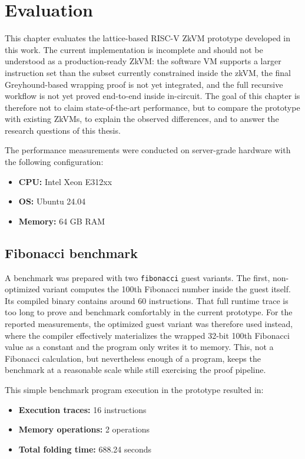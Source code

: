 \chapter{Evaluation}\label{chap:evaluation}

This chapter evaluates the lattice-based RISC-V ZkVM prototype developed in
this work. The current implementation is incomplete and should not be understood
as a production-ready ZkVM: the software VM supports a larger instruction set
than the subset currently constrained inside the zkVM, the final Greyhound-based
wrapping proof is not yet integrated, and the full recursive workflow is not
yet proved end-to-end inside in-circuit. The goal of this
chapter is therefore not to claim state-of-the-art performance, but to compare
the prototype with existing ZkVMs, to explain the observed differences, and to
answer the research questions of this thesis.

The performance measurements were conducted on server-grade hardware with the
following configuration:

\begin{itemize}
	\item \textbf{CPU:} Intel Xeon E312xx
	\item \textbf{OS:} Ubuntu 24.04
	\item \textbf{Memory:} 64 GB RAM
\end{itemize}

\section{Fibonacci benchmark}

A benchmark was prepared with two \texttt{fibonacci} guest variants. The first,
non-optimized variant computes the 100th Fibonacci number inside the guest
itself. Its compiled binary contains around 60 instructions. That full runtime
trace is too long to prove and benchmark comfortably in the current prototype.
For the reported measurements, the optimized guest variant was therefore used
instead, where the compiler effectively materializes the wrapped 32-bit 100th
Fibonacci value as a constant and the program only writes it to memory. This,
not a Fibonacci calculation, but nevertheless enough of a program,
keeps the benchmark at a reasonable scale while still exercising the proof pipeline.

This simple benchmark program execution in the prototype resulted in:

\begin{itemize}
	\item \textbf{Execution traces:} 16 instructions
	\item \textbf{Memory operations:} 2 operations
	\item \textbf{Total folding time:} 688.24 seconds
\end{itemize}

